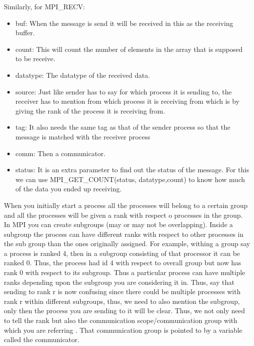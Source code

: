 \documentclass[12pt]{book}
\begin{document}
Similarly, for MPI\_RECV:
\begin{itemize}
    \item buf: When the message is send it will be received in this as the receiving buffer.
    \item count: This will count the number of elements in the array that is supposed to be receive.
    \item datatype: The datatype of the received data.
    \item source: Just like sender has to say for which process it is sending to, the receiver has to mention from which process it is receiving from which is by giving the rank of the process it is receiving from.
    \item tag: It also needs the same tag as that of the sender process so that the message is matched with the receiver process
    \item comm: Then a communicator.
    \item status: It is an extra parameter to find out the status of the message. For this we can use MPI\_GET\_COUNT(status, datatype,count) to know how much of the data you ended up receiving.
\end{itemize}

When you initially start a process all the processes will belong to a certain group and all the processes will be given a rank with respect o processes in the group. In MPI you can create subgroups (may or may not be overlapping). Inside a subgroup the process can have different ranks with respect to other processes in the sub group than the ones originally assigned. For example, withing a group say a process is ranked 4, then in a subgroup consisting of that processor it can be ranked 0. Thus, the process had id 4 with respect to overall group but now has rank 0 with respect to its subgroup. Thus a particular process can have multiple ranks depending upon the subgroup you are considering it in. Thus, say that sending to rank r is now confusing since there could be multiple processes with rank r within different subgroups, thus, we need to also mention the subgroup, only then the process you are sending to it will be clear.  Thus, we not only need to tell the rank but also the communication scope/communication group with which you are referring . That communication group is pointed to by a variable called the communicator.
\end{document}
